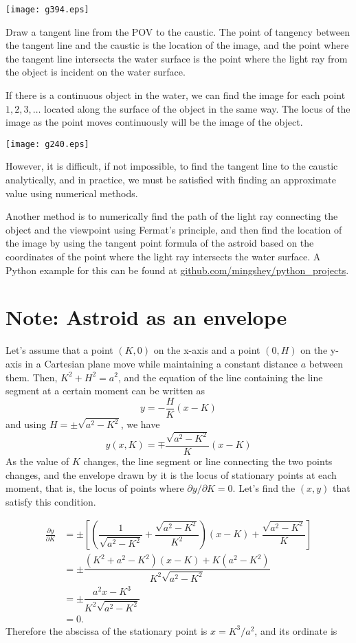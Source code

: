 \documentclass[twocolumn]{article}
\begin{document}
\texttt{[image: g394.eps]}

Draw a tangent line from the POV to the caustic. The point of tangency between the 
tangent line and the caustic is the location of the image, and the point where the 
tangent line intersects the water surface is the point where the light ray from 
the object is incident on the water surface.

If there is a continuous object in the water, we can find the image for each point
$1, 2, 3, \dots$ located along the surface of the object in the same way. The locus 
of the image as the point moves continuously will be the image of the object.

\texttt{[image: g240.eps]}

However, it is difficult, if not impossible, to find the tangent line to the caustic analytically, and 
in practice, we must be satisfied with finding an approximate value using numerical 
methods.

Another method is to numerically find the path of the light ray connecting the object 
and the viewpoint using Fermat's principle, and then find the location of the image 
by using the tangent point formula of the astroid based on the coordinates of the 
point where the light ray intersects the water surface. A Python example for this can 
be found at \href{https://github.com/mingshey/python_projects/blob/main/Refraction_Image_en.ipynb}%
{github.com/mingshey/python\_projects}.

\appendix
\newcommand{\pardiff}[2]{{\frac{\partial #1}{\partial #2}}}
\newcommand{\ilpardiff}[2]{{{\partial #1}/{\partial #2}}}
\section*{Note: Astroid as an envelope}
Let's assume that a point $(K, 0)$ on the x-axis and a point $(0, H)$ on the y-axis in a Cartesian plane move while maintaining a constant distance $a$ between them. Then, $K^2+H^2=a^2$, and the equation of the line containing the line segment at a certain moment can be written as
$$y=-\dfrac{H}{K}(x-K)$$
and using $H=\pm \sqrt{a^2-K^2}$, we have
$$y(x, K) = \mp \dfrac{\sqrt{a^2-K^2}}{K}(x-K)$$
As the value of $K$ changes, the line segment or line connecting the two points changes, and the envelope drawn by it is the locus of stationary points at each moment, that is, the locus of points where $\ilpardiff{y}{K} = 0$. Let's find the $(x, y)$ that satisfy this condition.

$$ \begin{aligned}
	\pardiff{y}{K} &= \pm\left[\left( \dfrac{1}{\sqrt{a^2-K^2}}+\dfrac{\sqrt{a^2-K^2}}{K^2}\right) (x-K) + \dfrac{\sqrt{a^2-K^2}}{K} \right]\\
	&= \pm \dfrac{(K^2+a^2-K^2)(x-K)+K(a^2-K^2)}{K^2\sqrt{a^2-K^2}}\\
	&= \pm \dfrac{a^2 x - K^3}{K^2 \sqrt{a^2 - K^2}}\\
	&= 0.
\end{aligned}
$$
Therefore the abscissa of the stationary point is $x = K^3/a^2$, and its ordinate is
\end{document}
